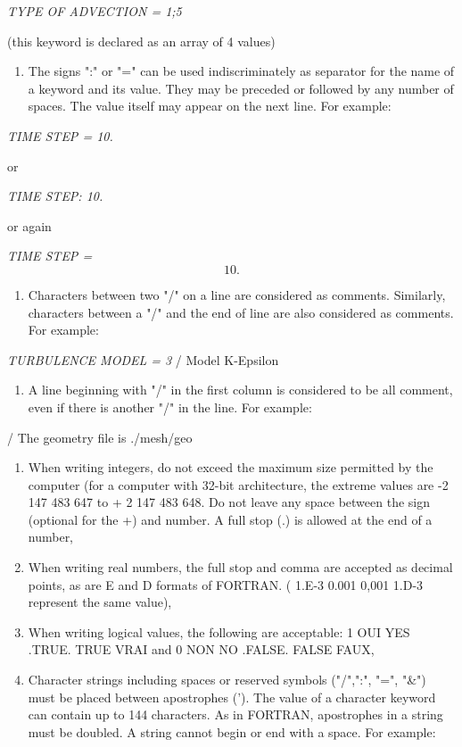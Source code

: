 \documentclass{article} %
\begin{document}
 \textit{TYPE OF ADVECTION = 1;5}

 (this keyword is declared as an array of 4 values)

\begin{enumerate}
\item  The signs ":" or "=" can be used indiscriminately as separator for the name of a keyword and its value. They may be preceded or followed by any number of spaces. The value itself may appear on the next line. For example:
\end{enumerate}

 \textit{TIME STEP =   10. }

or

 \textit{TIME STEP: 10.}

or again

 \textit{TIME STEP =}
\[10.\]

\begin{enumerate}
\item \textit{ }Characters between two "/" on a line are considered as comments. Similarly, characters between a "/" and the end of line are also considered as comments. For example:
\end{enumerate}

 \textit{TURBULENCE MODEL = 3}     / Model K-Epsilon

\begin{enumerate}
\item  A line beginning with "/" in the first column is considered to be all comment, even if there is another "/" in the line. For example:
\end{enumerate}

 / The geometry file is ./mesh/geo

\begin{enumerate}
\item  When writing integers, do not exceed the maximum size permitted by the computer (for a computer with 32-bit architecture, the extreme values are -2 147 483 647 to + 2 147 483 648. Do not leave any space between the sign (optional for the +) and number. A full stop (.) is allowed at the end of a number,

\item  When writing real numbers, the full stop and comma are accepted as decimal points, as are E and D formats of FORTRAN. ( 1.E-3  0.001  0,001  1.D-3 represent the same value),

\item  When writing logical values, the following are acceptable: 1 OUI  YES  .TRUE.  TRUE  VRAI and 0 NON  NO  .FALSE.  FALSE  FAUX,

\item  Character strings including spaces or reserved symbols ("/",":", "=", "\&") must be placed between apostrophes ('). The value of a character keyword can contain up to 144 characters. As in FORTRAN, apostrophes in a string must be doubled. A string cannot begin or end with a space. For example:
\end{enumerate}
\end{document}
